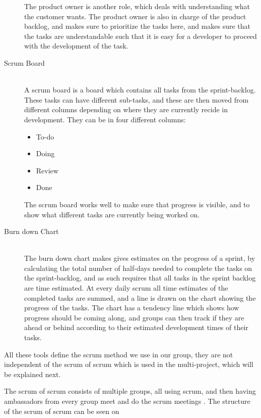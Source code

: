 \begin{description}
	The product owner is another role, which deals with understanding what the customer wants.
	The product owner is also in charge of the product backlog, and makes sure to prioritize the tasks here, and makes sure that the tasks are understandable such that it is easy for a developer to proceed with the development of the task.
	\item[Scrum Board] \hfill \\
	A scrum board is a board which contains all tasks from the sprint-backlog.
	These tasks can have different sub-tasks, and these are then moved from different columns depending on where they are currently recide in development.
	They can be in four different columns:
	\begin{itemize}
		\item To-do
		\item Doing
		\item Review
		\item Done
	\end{itemize}
	The scrum board works well to make sure that progress is visible, and to show what different tasks are currently being worked on.
	\item[Burn down Chart] \hfill \\
	The burn down chart makes gives estimates on the progress of a sprint, by calculating the total number of half-days needed to complete the tasks on the sprint-backlog, and as such requires that all tasks in the sprint backlog are time estimated.
	At every daily scrum all time estimates of the completed tasks are summed, and a line is drawn on the chart showing the progress of the tasks.
	The chart has a tendency line which shows how progress should be coming along, and groups can then track if they are ahead or behind according to their estimated development times of their tasks.
\end{description}

All these tools define the scrum method we use in our group, they are not independent of the scrum of scrum which is used in the multi-project, which will be explained next.

The scrum of scrum consists of multiple groups, all using scrum, and then having ambassadors from every group meet and do the scrum meetings \cite{SCRUMBOOK}.
The structure of the scrum of scrum can be seen on 

